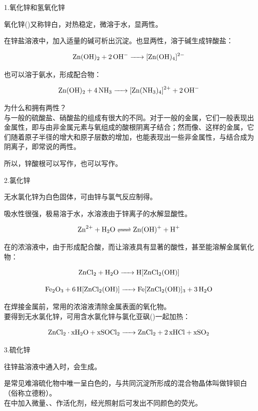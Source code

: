 \documentclass[a4paper,UTF8]{article}
\begin{document}
1.氧化锌和氢氧化锌

氧化锌()又称锌白，对热稳定，微溶于水，显两性。

在锌盐溶液中，加入适量的碱可析出沉淀。也显两性，溶于碱生成锌酸盐：

$$ \ce{Zn(OH)2 + 2OH- -> [Zn(OH)4]^{2-}} $$

也可以溶于氨水，形成配合物：

$$ \ce{Zn(OH)2 + 4NH3 -> [Zn(NH3)4]^{2+} + 2OH-} $$

\begin{tcolorbox}

为什么和拥有两性？\\

与一般的硫酸盐、硝酸盐的组成有很大的不同。对于一般的金属，它们一般表现出金属性，即与由非金属元素与氧组成的酸根阴离子结合；然而像、这样的金属，它们随着原子半径的增大和原子层数的增加，也能表现出一些非金属性，与结合成为阴离子，即常说的两性。

所以，锌酸根可以写作，也可以写作。

\end{tcolorbox}

2.氯化锌

无水氯化锌为白色固体，可由锌与氯气反应制得。

吸水性很强，极易溶于水，水溶液由于锌离子的水解显酸性。

$$ \ce{Zn^{2+} + H2O <=> Zn(OH)+ + H+} $$

在的浓溶液中，由于形成配合酸，而让溶液具有显著的酸性，甚至能溶解金属氧化物：

$$ \ce{ZnCl2 + H2O -> H[ZnCl2(OH)]} $$

$$ \ce{Fe2O3 + 6H[ZnCl2(OH)] -> Fe[ZnCl2(OH)]3 + 3H2O} $$

在焊接金属前，常用的浓溶液清除金属表面的氧化物。\\

要得到无水氯化锌，可用含水氯化锌与氯化亚砜()一起加热：

$$ \ce{ZnCl2\cdot xH2O + xSOCl2 -> ZnCl2 + 2xHCl + xSO2} $$

3.硫化锌

往锌盐溶液中通入时，会生成。

是常见难溶硫化物中唯一呈白色的，与共同沉淀所形成的混合物晶体叫做锌钡白（俗称立德粉）。\\

在中加入微量、、作活化剂，经光照射后可发出不同颜色的荧光。
\end{document}
